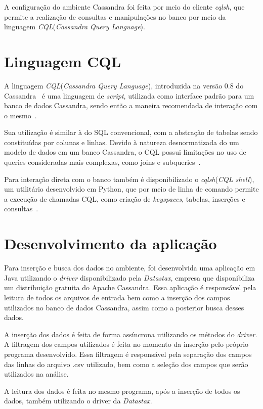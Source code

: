A configuração do ambiente Cassandra foi feita por meio do cliente \emph{cqlsh}, que permite a realização de consultas e manipulações no banco por meio da linguagem \emph{CQL}(\emph{Cassandra Query Language}).

\section{Linguagem CQL}
A linguagem \emph{CQL}(\emph{Cassandra Query Language}), introduzida na versão 0.8 do Cassandra~\cite{cassandra08} é uma linguagem de \emph{script}, utilizada como interface padrão para um banco de dados Cassandra, sendo então a maneira recomendada de interação com o mesmo~\cite{cassandracql}. 

Sua utilização é similar à do SQL convencional, com a abstração de tabelas sendo constituídas por colunas e linhas. Devido à natureza desnormatizada do um modelo de dados em um banco Cassandra, o CQL possui limitações no uso de queries consideradas mais complexas, como joins e subqueries~\cite{cassandracql}.

Para interação direta com o banco também é disponibilizado o \emph{cqlsh}(\emph{CQL shell}), um utilitário desenvolvido em Python, que por meio de linha de comando permite a execução de chamadas CQL, como criação de \emph{keyspaces}, tabelas, inserções e consultas~\cite{cassandra_intro_cql}.

\section{Desenvolvimento da aplicação}
Para inserção e busca dos dados no ambiente, foi desenvolvida uma aplicação em Java utilizando o \emph{driver} disponibilizado pela \emph{Datastax}, empresa que disponibiliza um distribuição gratuita do Apache Cassandra. Essa aplicação é responsável pela leitura de todos os arquivos de entrada bem como a inserção dos campos utilizados no banco de dados Cassandra, assim como a posterior busca desses dados.

A inserção dos dados é feita de forma assíncrona utilizando os métodos do \emph{driver}. A filtragem dos campos utilizados é feita no momento da inserção pelo próprio programa desenvolvido. Essa filtragem é responsável pela separação dos campos das linhas do arquivo .csv utilizado, bem como a seleção dos campos que serão utilizados na análise.

A leitura dos dados é feita no mesmo programa, após a inserção de todos os dados, também utilizando o driver da \emph{Datastax}.

